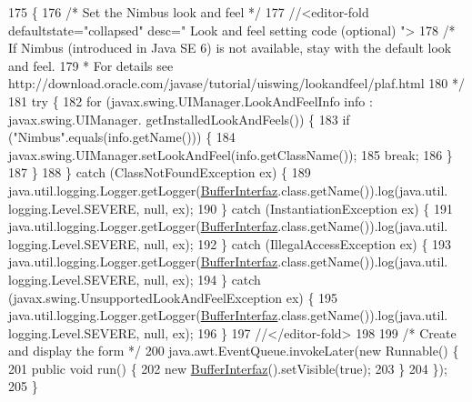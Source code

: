 \begin{DoxyCode}
175                                            \{
176         \textcolor{comment}{/* Set the Nimbus look and feel */}
177         \textcolor{comment}{//<editor-fold defaultstate="collapsed" desc=" Look and feel setting code (optional) ">}
178         \textcolor{comment}{/* If Nimbus (introduced in Java SE 6) is not available, stay with the default look and feel.}
179 \textcolor{comment}{         * For details see http://download.oracle.com/javase/tutorial/uiswing/lookandfeel/plaf.html }
180 \textcolor{comment}{         */}
181         \textcolor{keywordflow}{try} \{
182             \textcolor{keywordflow}{for} (javax.swing.UIManager.LookAndFeelInfo info : javax.swing.UIManager.
      getInstalledLookAndFeels()) \{
183                 \textcolor{keywordflow}{if} (\textcolor{stringliteral}{"Nimbus"}.equals(info.getName())) \{
184                     javax.swing.UIManager.setLookAndFeel(info.getClassName());
185                     \textcolor{keywordflow}{break};
186                 \}
187             \}
188         \} \textcolor{keywordflow}{catch} (ClassNotFoundException ex) \{
189             java.util.logging.Logger.getLogger(\mbox{\hyperlink{class_ejercicio2_1_1_buffer_interfaz_a659117fee6f4a16a187bf9a637bbbad4}{BufferInterfaz}}.class.getName()).log(java.util.
      logging.Level.SEVERE, null, ex);
190         \} \textcolor{keywordflow}{catch} (InstantiationException ex) \{
191             java.util.logging.Logger.getLogger(\mbox{\hyperlink{class_ejercicio2_1_1_buffer_interfaz_a659117fee6f4a16a187bf9a637bbbad4}{BufferInterfaz}}.class.getName()).log(java.util.
      logging.Level.SEVERE, null, ex);
192         \} \textcolor{keywordflow}{catch} (IllegalAccessException ex) \{
193             java.util.logging.Logger.getLogger(\mbox{\hyperlink{class_ejercicio2_1_1_buffer_interfaz_a659117fee6f4a16a187bf9a637bbbad4}{BufferInterfaz}}.class.getName()).log(java.util.
      logging.Level.SEVERE, null, ex);
194         \} \textcolor{keywordflow}{catch} (javax.swing.UnsupportedLookAndFeelException ex) \{
195             java.util.logging.Logger.getLogger(\mbox{\hyperlink{class_ejercicio2_1_1_buffer_interfaz_a659117fee6f4a16a187bf9a637bbbad4}{BufferInterfaz}}.class.getName()).log(java.util.
      logging.Level.SEVERE, null, ex);
196         \}
197         \textcolor{comment}{//</editor-fold>}
198 
199         \textcolor{comment}{/* Create and display the form */}
200         java.awt.EventQueue.invokeLater(\textcolor{keyword}{new} Runnable() \{
201             \textcolor{keyword}{public} \textcolor{keywordtype}{void} run() \{
202                 \textcolor{keyword}{new} \mbox{\hyperlink{class_ejercicio2_1_1_buffer_interfaz_a659117fee6f4a16a187bf9a637bbbad4}{BufferInterfaz}}().setVisible(\textcolor{keyword}{true});
203             \}
204         \});
205     \}
\end{DoxyCode}


